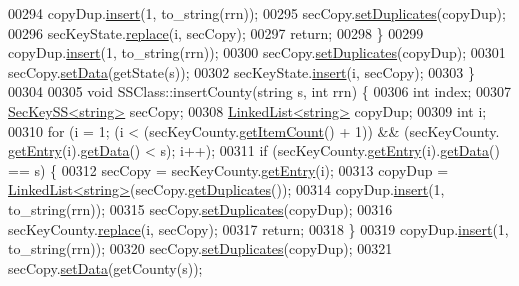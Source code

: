 \begin{DoxyCode}
00294         copyDup.\hyperlink{classLinkedList_ae8a19375505e87e2e4fc0e9b5afe4d4d}{insert}(1, to\_string(rrn));
00295         secCopy.\hyperlink{classSecKeySS_a95fdde8fc0b590359692784d15481dd4}{setDuplicates}(copyDup);
00296         secKeyState.\hyperlink{classLinkedList_a3035f880c50e7d8f68e67c093d4607ca}{replace}(i, secCopy);
00297         \textcolor{keywordflow}{return};
00298     \}
00299     copyDup.\hyperlink{classLinkedList_ae8a19375505e87e2e4fc0e9b5afe4d4d}{insert}(1, to\_string(rrn));
00300     secCopy.\hyperlink{classSecKeySS_a95fdde8fc0b590359692784d15481dd4}{setDuplicates}(copyDup);
00301     secCopy.\hyperlink{classSecKeySS_ae893fbaf619bf61f73f1585ae5686609}{setData}(getState(s));
00302     secKeyState.\hyperlink{classLinkedList_ae8a19375505e87e2e4fc0e9b5afe4d4d}{insert}(i, secCopy);
00303 \}
00304 
00305 \textcolor{keywordtype}{void} SSClass::insertCounty(\textcolor{keywordtype}{string} s, \textcolor{keywordtype}{int} rrn) \{
00306     \textcolor{keywordtype}{int} index;
00307     \hyperlink{classSecKeySS}{SecKeySS<string>} secCopy;
00308     \hyperlink{classLinkedList}{LinkedList<string>} copyDup;
00309         \textcolor{keywordtype}{int} i;
00310     \textcolor{keywordflow}{for} (i = 1; (i < (secKeyCounty.\hyperlink{classLinkedList_afc6635f854f48f2f126cf3b60d845220}{getItemCount}() + 1)) && (secKeyCounty.
      \hyperlink{classLinkedList_a341bfd7772c9d24d29eb7a7f3936915b}{getEntry}(i).\hyperlink{classSecKeySS_a9fdb8a771250b7aaab556f019b381eab}{getData}() < s); i++);
00311     \textcolor{keywordflow}{if} (secKeyCounty.\hyperlink{classLinkedList_a341bfd7772c9d24d29eb7a7f3936915b}{getEntry}(i).\hyperlink{classSecKeySS_a9fdb8a771250b7aaab556f019b381eab}{getData}() == s) \{
00312         secCopy = secKeyCounty.\hyperlink{classLinkedList_a341bfd7772c9d24d29eb7a7f3936915b}{getEntry}(i);
00313         copyDup = \hyperlink{classLinkedList}{LinkedList<string>}(secCopy.\hyperlink{classSecKeySS_abef7c9c03e9bc6b818d599966428fdec}{getDuplicates}());
00314         copyDup.\hyperlink{classLinkedList_ae8a19375505e87e2e4fc0e9b5afe4d4d}{insert}(1, to\_string(rrn));
00315         secCopy.\hyperlink{classSecKeySS_a95fdde8fc0b590359692784d15481dd4}{setDuplicates}(copyDup);
00316         secKeyCounty.\hyperlink{classLinkedList_a3035f880c50e7d8f68e67c093d4607ca}{replace}(i, secCopy);
00317         \textcolor{keywordflow}{return};
00318     \}
00319     copyDup.\hyperlink{classLinkedList_ae8a19375505e87e2e4fc0e9b5afe4d4d}{insert}(1, to\_string(rrn));
00320     secCopy.\hyperlink{classSecKeySS_a95fdde8fc0b590359692784d15481dd4}{setDuplicates}(copyDup);
00321     secCopy.\hyperlink{classSecKeySS_ae893fbaf619bf61f73f1585ae5686609}{setData}(getCounty(s));

\end{DoxyCode}
